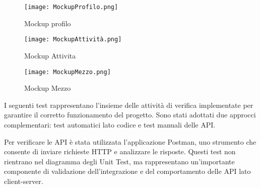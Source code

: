 \documentclass[a4paper]{report}
\begin{document}
\begin{figure*}[ht]
    \centering
    \texttt{[image: MockupProfilo.png]}
    \caption{Mockup profilo}
    \label{fig:mockup_Profilo}
\end{figure*}

\begin{figure*}[ht]
    \centering
    \texttt{[image: MockupAttività.png]}
    \caption{Mockup Attivita}
    \label{fig:Attività}
\end{figure*}

\begin{figure*}[ht]
    \centering
    \texttt{[image: MockupMezzo.png]}
    \caption{Mockup Mezzo}
    \label{fig:mockup_Mezzo}
\end{figure*}

\clearpage
{}
I seguenti test rappresentano l’insieme delle attività di verifica implementate per garantire il corretto funzionamento del progetto. Sono stati adottati due approcci complementari: test automatici lato codice e test manuali delle API.

Per verificare le API è stata utilizzata l’applicazione Postman, uno strumento che consente di inviare richieste HTTP e analizzare le risposte. Questi test non rientrano nel diagramma degli Unit Test, ma rappresentano un'importante componente di validazione dell’integrazione e del comportamento delle API lato client-server.
\end{document}
